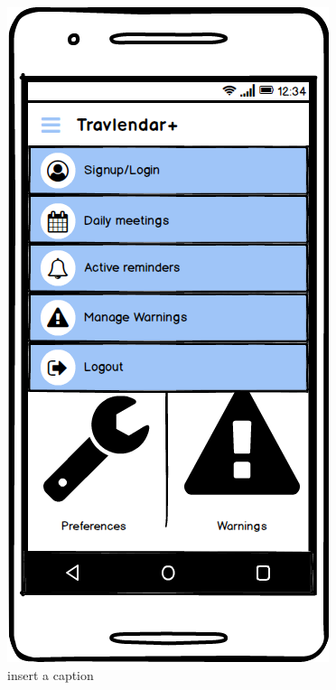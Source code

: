 \documentclass[11pt]{article}
\begin{document}
	\begin{figure}
		\centering
		\includegraphics[width=0.7\linewidth]{QuickMenu.png}
		\caption{insert a caption}
		\label{fig:quickmenu}
	\end{figure}
	
\end{document}
